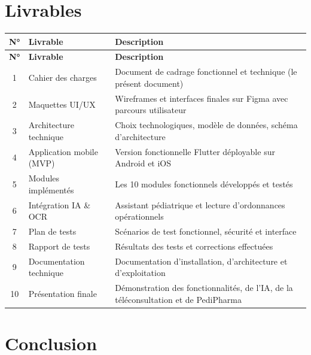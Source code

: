 \documentclass[11pt,a4paper]{article}
\newcommand{\headrow}{\rowcolor{navy}}
\newcommand{\tblhead}[1]{\color{white}\textbf{#1}}
\begin{document}
\normalsize

\section{Livrables}

\renewcommand{\arraystretch}{1.4}
\begin{longtable}{|c|p{4cm}|p{8cm}|}
\hline
\headrow \tblhead{N°} & \tblhead{Livrable} & \tblhead{Description} \\
\hline
\endfirsthead
\hline
\headrow \tblhead{N°} & \tblhead{Livrable} & \tblhead{Description} \\
\hline
\endhead
1 & Cahier des charges & Document de cadrage fonctionnel et technique (le présent document) \\
\hline
\rowcolor{rowgrey}
2 & Maquettes UI/UX & Wireframes et interfaces finales sur Figma avec parcours utilisateur \\
\hline
3 & Architecture technique & Choix technologiques, modèle de données, schéma d'architecture \\
\hline
\rowcolor{rowgrey}
4 & Application mobile (MVP) & Version fonctionnelle Flutter déployable sur Android et iOS \\
\hline
5 & Modules implémentés & Les 10 modules fonctionnels développés et testés \\
\hline
\rowcolor{rowgrey}
6 & Intégration IA \& OCR & Assistant pédiatrique et lecture d'ordonnances opérationnels \\
\hline
7 & Plan de tests & Scénarios de test fonctionnel, sécurité et interface \\
\hline
\rowcolor{rowgrey}
8 & Rapport de tests & Résultats des tests et corrections effectuées \\
\hline
9 & Documentation technique & Documentation d'installation, d'architecture et d'exploitation \\
\hline
\rowcolor{rowgrey}
10 & Présentation finale & Démonstration des fonctionnalités, de l'IA, de la téléconsultation et de PediPharma \\
\hline
\end{longtable}

\section*{Conclusion}
\end{document}
